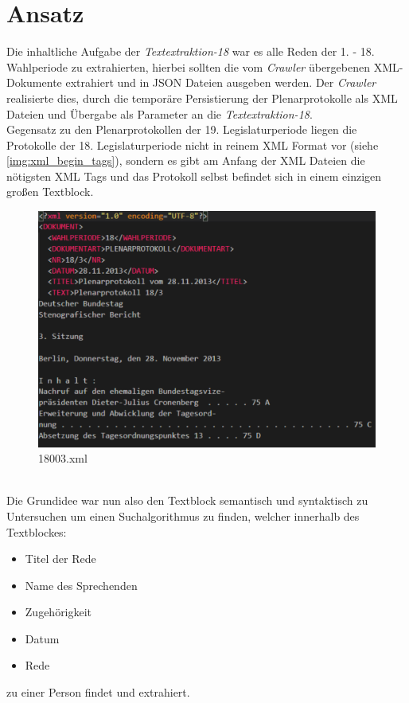 \chapter{Ansatz}
Die inhaltliche Aufgabe der \textit{Textextraktion-18} war es alle Reden der 1. - 18. Wahlperiode zu extrahierten, hierbei sollten die vom \textit{Crawler} übergebenen XML-Dokumente extrahiert und in JSON Dateien ausgeben werden. Der \textit{Crawler} realisierte dies, durch die temporäre Persistierung der Plenarprotokolle als XML Dateien\cite{protokolle} und Übergabe als Parameter an die \textit{Textextraktion-18}.\\

\noindent Gegensatz zu den Plenarprotokollen der 19. Legislaturperiode liegen die Protokolle der 18. Legislaturperiode nicht in reinem XML Format vor (siehe \autoref{img:xml_begin_tags}), sondern es gibt am Anfang der XML Dateien die nötigsten XML Tags und das Protokoll selbst befindet sich in einem einzigen großen Textblock.
\begin{figure}[h]
	\includegraphics[width=\linewidth]{img/xml_begin_tags.pdf}
	\caption{18003.xml}
	\label{img:xml_begin_tags}
\end{figure}\\
Die Grundidee war nun also den Textblock semantisch und syntaktisch zu Untersuchen um einen Suchalgorithmus zu finden, welcher innerhalb des Textblockes:
\begin{multicols}{3}
	\begin{itemize}
		\item Titel der Rede
		\item Name des Sprechenden
		\item Zugehörigkeit
		\item Datum
		\item Rede
	\end{itemize}
\end{multicols}
zu einer Person findet und extrahiert.